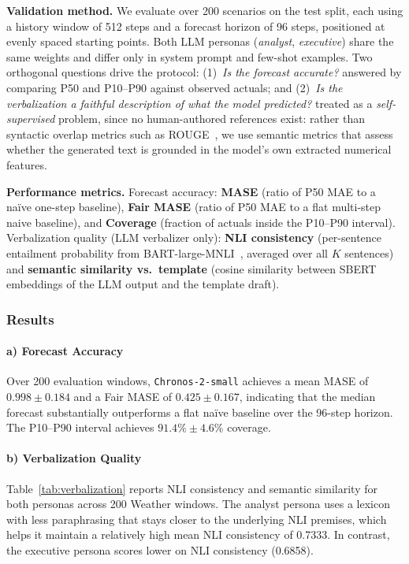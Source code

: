 \documentclass[conference]{IEEEtran}
\begin{document}
\textbf{Validation method.}
We evaluate over 200 scenarios on the test split, each using a history window of 512 steps and a forecast horizon of 96 steps, positioned at evenly spaced starting points. Both LLM personas (\emph{analyst}, \emph{executive}) share the same weights and differ only in system prompt and few-shot examples. Two orthogonal questions drive the protocol: (1)~\emph{Is the forecast accurate?} answered by comparing P50 and P10--P90 against observed actuals; and (2)~\emph{Is the verbalization a faithful description of what the model predicted?} treated as a \emph{self-supervised} problem, since no human-authored references exist: rather than syntactic overlap metrics such as ROUGE~\cite{lin2004rouge}, we use semantic metrics that assess whether the generated text is grounded in the model's own extracted numerical features.

\textbf{Performance metrics.}
Forecast accuracy: \textbf{MASE} (ratio of P50 MAE to a na\"ive one-step baseline), \textbf{Fair MASE} (ratio of P50 MAE to a flat multi-step naive baseline), and \textbf{Coverage} (fraction of actuals inside the P10--P90 interval).
Verbalization quality (LLM verbalizer only): \textbf{NLI consistency} (per-sentence entailment probability from BART-large-MNLI~\cite{lewis2020bart}, averaged over all $K$ sentences) and \textbf{semantic similarity vs.\ template} (cosine similarity between SBERT~\cite{reimers2019sbert} embeddings of the LLM output and the template draft).

\subsubsection{Results}

\paragraph*{a) Forecast Accuracy}
Over 200 evaluation windows, \texttt{Chronos-2-small} achieves a mean MASE of $0.998 \pm 0.184$ and a Fair MASE of $0.425 \pm 0.167$, indicating that the median forecast substantially outperforms a flat na\"ive baseline over the 96-step horizon. The P10--P90 interval achieves $91.4\% \pm 4.6\%$ coverage.

\paragraph*{b) Verbalization Quality}

Table~\ref{tab:verbalization} reports NLI consistency and semantic similarity for both personas across 200 Weather windows. The analyst persona uses a lexicon with less paraphrasing that stays closer to the underlying NLI premises, which helps it maintain a relatively high mean NLI consistency of 0.7333. In contrast, the executive persona scores lower on NLI consistency (0.6858).
\end{document}
